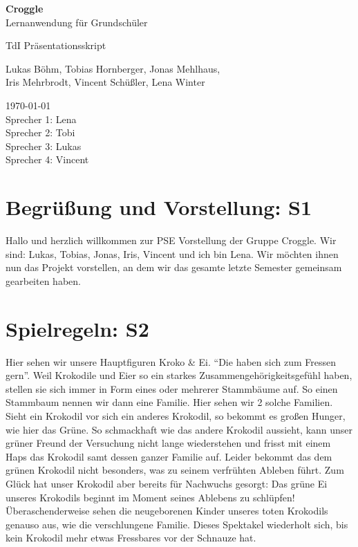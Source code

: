 \documentclass{scrartcl}
\begin{document}
	\begin{titlepage}
		\begin{center}
			{\huge \bfseries Croggle}\\[0.1cm]
			{\large  Lernanwendung für Grundschüler}
		\end{center}


		\begin{center}
			{\Large TdI Präsentationsskript}\\[0.5cm]
		\end{center}
		\begin{center}
			{Lukas Böhm, Tobias Hornberger, Jonas Mehlhaus, \\ Iris Mehrbrodt, Vincent Schüßler, Lena Winter} \\[1cm]
		\end{center}

		\begin{center}
			{\large \today \\
				Sprecher 1: Lena \\
				Sprecher 2:	Tobi \\
				Sprecher 3: Lukas \\
				Sprecher 4: Vincent
			}
		\end{center}
	\end{titlepage}

	\section{Begrüßung und Vorstellung: S1}
	Hallo und herzlich willkommen zur PSE Vorstellung der Gruppe Croggle.
	Wir sind: Lukas, Tobias, Jonas, Iris, Vincent und ich bin Lena.
	Wir möchten ihnen nun das Projekt vorstellen, an dem wir das gesamte letzte Semester gemeinsam gearbeiten haben.

	\section{Spielregeln: S2} 
	Hier sehen wir unsere Hauptfiguren Kroko \& Ei.
	"`Die haben sich zum Fressen gern"'.
	Weil Krokodile und Eier so ein starkes Zusammengehörigkeitsgefühl haben, stellen sie sich immer in Form eines oder mehrerer Stammbäume auf.
	So einen Stammbaum nennen wir dann eine Familie.
	Hier sehen wir 2 solche Familien.	
	Sieht ein Krokodil vor sich ein anderes Krokodil, so bekommt es großen Hunger, wie hier das Grüne. So schmackhaft wie das andere Krokodil aussieht, kann unser grüner Freund der Versuchung nicht lange wiederstehen und frisst mit einem Haps das Krokodil samt dessen ganzer Familie auf.
	Leider bekommt das dem grünen Krokodil nicht besonders, was zu seinem verfrühten Ableben führt.
	Zum Glück hat unser Krokodil aber bereits für Nachwuchs gesorgt: Das grüne Ei unseres Krokodils beginnt im Moment seines Ablebens zu schlüpfen!
	Überaschenderweise sehen die neugeborenen Kinder unseres toten Krokodils genauso aus, wie die verschlungene Familie.
	Dieses Spektakel wiederholt sich, bis kein Krokodil mehr etwas Fressbares vor der Schnauze hat.
\end{document}
